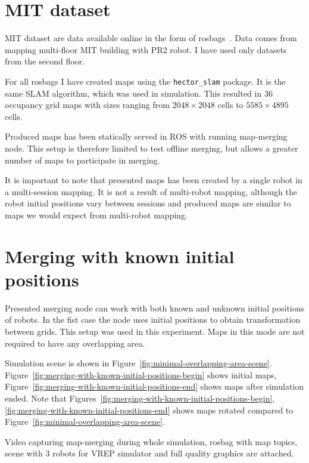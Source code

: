 \section{\gls{MIT} dataset}
\label{sec:mit-dataset}

\gls{MIT} dataset are data available online in the form of rosbags~\cite{Fallon2013}. Data comes from mapping multi-floor \gls{MIT} building with PR2 robot. I have used only datasets from the second floor.

For all rosbags I have created maps using the \texttt{hector\_slam} package. It is the same \gls{SLAM} algorithm, which was used in simulation. This resulted in $36$ occupancy grid maps with sizes ranging from $2048 \times 2048$ cells to $5585 \times 4895$ cells.

Produced maps has been statically served in \gls{ROS} with running map-merging node. This setup is therefore limited to test offline merging, but allows a greater number of maps to participate in merging.

It is important to note that presented maps has been created by a single robot in a multi-session mapping. It is not a result of multi-robot mapping, although the robot initial positions vary between sessions and produced maps are similar to maps we would expect from multi-robot mapping.

\section{Merging with known initial positions}
\label{sec:merging-with-known-initial-positions}

Presented merging node can work with both known and unknown initial positions of robots. In the fist case the node uses initial positions to obtain transformation between grids. This setup was used in this experiment. Maps in this mode are not required to have any overlapping area.

Simulation scene is shown in Figure~\ref{fig:minimal-overlapping-area-scene}. Figure~\ref{fig:merging-with-known-initial-positions-begin} shows initial maps, Figure~\ref{fig:merging-with-known-initial-positions-end} shows maps after simulation ended. Note that Figures~\ref{fig:merging-with-known-initial-positions-begin}, \ref{fig:merging-with-known-initial-positions-end} shows maps rotated compared to Figure~\ref{fig:minimal-overlapping-area-scene}.

Video capturing map-merging during whole simulation, rosbag with map topics, scene with $3$ robots for \gls{VREP} simulator and full quality graphics are attached.

